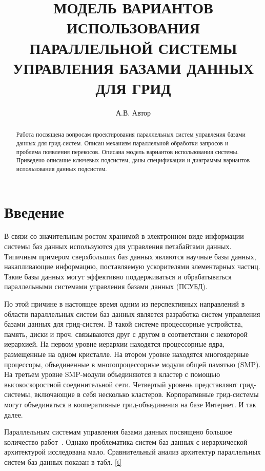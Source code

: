 \documentclass[11pt,oneside]{article}
\begin{document}
	\newcommand{\phan}{\hspace*{0cm}}
	\newcommand{\comment}{}

	\author{А.В. Автор}
	\title{МОДЕЛЬ ВАРИАНТОВ ИСПОЛЬЗОВАНИЯ ПАРАЛЛЕЛЬНОЙ СИСТЕМЫ УПРАВЛЕНИЯ БАЗАМИ ДАННЫХ ДЛЯ ГРИД}
	\maketitle{}

	\begin{abstract}
		Работа посвящена вопросам проектирования параллельных систем управления базами данных для грид-систем. Описан механизм параллельной обработки запросов и проблема появления перекосов. Описана модель вариантов использования системы. Приведено описание ключевых подсистем, даны спецификации и диаграммы вариантов использования данных подсистем.
	\end{abstract}


	
	\section*{Введение}
	\par В связи со значительным ростом хранимой в электронном виде информации системы баз данных используются для управления петабайтами данных. Типичным примером сверхбольших баз данных являются научные базы данных, накапливающие информацию, поставляемую ускорителями элементарных частиц. Такие базы данных могут эффективно поддерживаться и обрабатываться параллельными системами управления базами данных (ПСУБД).
	\par По этой причине в настоящее время одним из перспективных направлений в области параллельных систем баз данных является разработка систем управления базами данных для грид-систем. В такой системе процессорные устройства, память, диски и проч. связываются друг с другом в соответствии с некоторой иерархией. На первом уровне иерархии находятся процессорные ядра, размещенные на одном кристалле. На втором уровне находятся многоядерные процессоры, объединенные в многопроцессорные модули общей памятью (SMP). На третьем уровне SMP-модули объединяются в кластер с помощью высокоскоростной соединительной сети. Четвертый уровень представляют грид-системы, включающие в себя несколько кластеров. Корпоративные грид-системы могут объединяться в кооперативные грид-объединения на базе Интернет. И так далее.
	\par Параллельным системам управления базами данных посвящено большое количество работ~\cite{B_Gray2005, B_Mehta1997, B_Williams1998}. Однако проблематика систем баз данных с иерархической архитектурой исследована мало. Сравнительный анализ архитектур параллельных систем баз данных показан в табл. \ref{t}
\end{document}

